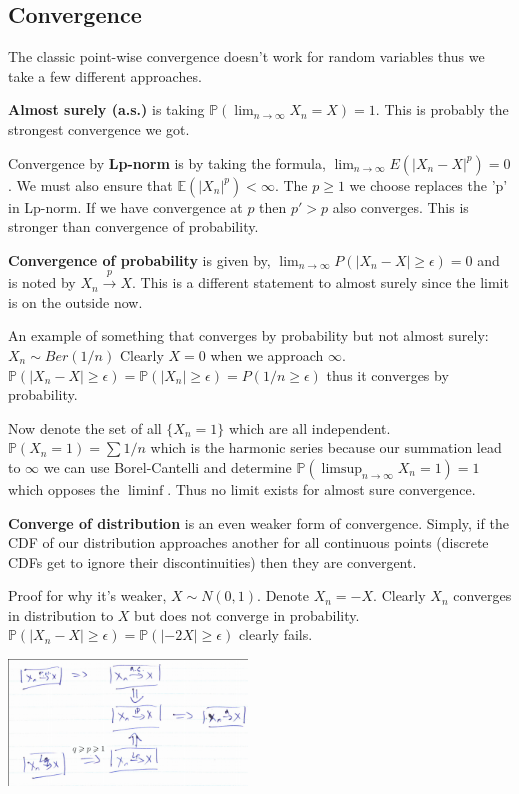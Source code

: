 \documentclass[10pt,landscape,a4paper]{article}
\begin{document}
\begin{multicols*}{4}
\subsection{Convergence}
The classic point-wise convergence doesn't work for random variables thus we
take a few different approaches.

\textbf{Almost surely (a.s.)} is taking
$\mathbb{P}(\lim_{n\to\infty} X_n = X) = 1$.
This is probably the strongest convergence we got.

Convergence by \textbf{Lp-norm} is by taking the formula,
$\lim_{n\to\infty} E(|X_n - X|^p) = 0$.
We must also ensure that $\mathbb{E}(|X_n|^p) < \infty$.
The $p \geq 1$ we choose replaces the 'p' in Lp-norm.
If we have convergence at $p$ then $p' > p$ also converges. This is stronger
than convergence of probability.

\textbf{Convergence of probability} is given by,
$\lim_{n\to\infty} P(|X_n - X| \geq \epsilon) = 0$
and is noted by $X_n \xrightarrow{p} X$. This is a different statement to
almost surely since the limit is on the outside now.

An example of something that converges by probability but not almost surely:
$X_n \sim Ber(1/n)$
Clearly $X=0$ when we approach $\infty$.
$\mathbb{P}(|X_n - X| \geq \epsilon) = \mathbb{P}(|X_n| \geq \epsilon)
= P(1/n \geq \epsilon)$ thus it converges by probability.

Now denote the set of all $\{X_n = 1\}$ which are all independent.
$\mathbb{P}(X_n = 1) = \sum 1/n$ which is the harmonic series because our
summation lead to $\infty$ we can use Borel-Cantelli and determine
$\mathbb{P}(\limsup_{n\to\infty} X_n = 1) = 1$ which opposes the $\liminf$.
Thus no limit exists for almost sure convergence.

\textbf{Converge of distribution} is an even weaker form of convergence.
Simply, if the CDF of our distribution approaches another for all continuous
points (discrete CDFs get to ignore their discontinuities) then they are
convergent.

Proof for why it's weaker,
$X \sim N(0,1)$. Denote $X_n = -X$. Clearly $X_n$ converges in distribution
to $X$ but does not converge in probability.
$\mathbb{P}(|X_n - X| \geq \epsilon) = \mathbb{P}(|-2X| \geq \epsilon)$
clearly fails.

\includegraphics[width=2.5in]{img.png}

\end{multicols*}
\end{document}
